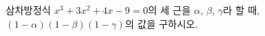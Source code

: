 삼차방정식 $x^3+3x^2+4x-9=0$의 세 근을 $\alpha$, $\beta$, $\gamma$라 할 때, $(1-\alpha)(1-\beta)(1-\gamma)$의 값을 구하시오.
